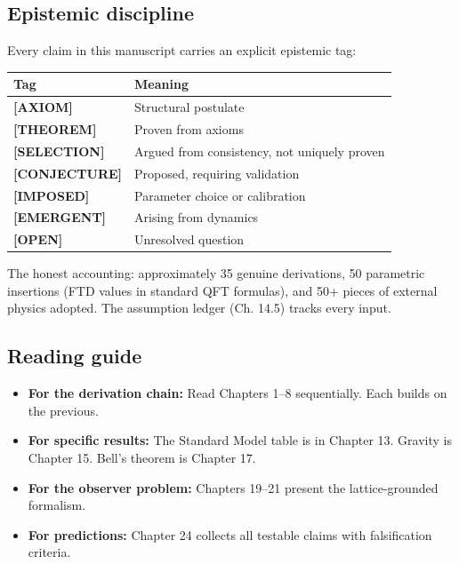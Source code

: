 \documentclass[
  11pt,
  letterpaper,
  twoside,
  openany]{book}
\makeatletter
\providecommand{\tightlist}{%
  \setlength{\itemsep}{0pt}\setlength{\parskip}{0pt}}
\let\orig@subsection\subsection
\renewcommand{\subsection}{\needspace{6\baselineskip}\orig@subsection}
\makeatother
\begin{document}
\subsection*{Epistemic discipline}\label{epistemic-discipline}

Every claim in this manuscript carries an explicit epistemic tag:

\begin{longtable}[]{@{}ll@{}}
\toprule\noalign{}
Tag & Meaning \\
\midrule\noalign{}
\endhead
\bottomrule\noalign{}
\endlastfoot
\textbf{{[}AXIOM{]}} & Structural postulate \\
\textbf{{[}THEOREM{]}} & Proven from axioms \\
\textbf{{[}SELECTION{]}} & Argued from consistency, not uniquely
proven \\
\textbf{{[}CONJECTURE{]}} & Proposed, requiring validation \\
\textbf{{[}IMPOSED{]}} & Parameter choice or calibration \\
\textbf{{[}EMERGENT{]}} & Arising from dynamics \\
\textbf{{[}OPEN{]}} & Unresolved question \\
\end{longtable}

The honest accounting: approximately 35 genuine derivations, 50
parametric insertions (FTD values in standard QFT formulas), and 50+
pieces of external physics adopted. The assumption ledger (Ch. 14.5)
tracks every input.

\subsection*{Reading guide}\label{reading-guide}

\begin{itemize}
\tightlist
\item
  \textbf{For the derivation chain:} Read Chapters 1--8 sequentially.
  Each builds on the previous.
\item
  \textbf{For specific results:} The Standard Model table is in Chapter
  13. Gravity is Chapter 15. Bell's theorem is Chapter 17.
\item
  \textbf{For the observer problem:} Chapters 19--21 present the
  lattice-grounded formalism.
\item
  \textbf{For predictions:} Chapter 24 collects all testable claims with
  falsification criteria.
\end{itemize}
\end{document}
